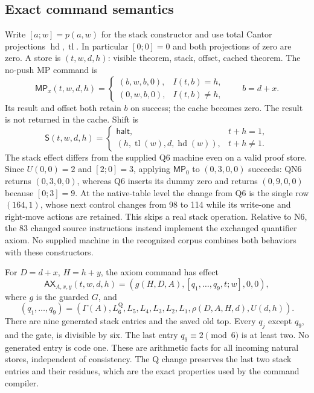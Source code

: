 \subsection{Exact command semantics}

Write $[a;w]=p(a,w)$ for the stack constructor and use total Cantor
projections $\operatorname{hd},\operatorname{tl}$. In particular
$[0;0]=0$ and both projections of zero are zero. A store is $(t,w,d,h)$:
visible theorem, stack, offset, cached theorem. The no-push MP command is
\[
 \mathsf{MP}_x(t,w,d,h)=
 \begin{cases}
 (b,w,b,0),& I(t,b)=h,\\
 (0,w,b,0),& I(t,b)\ne h,
 \end{cases}
 \qquad b=d+x.                                      \tag{QN3}
\]
Its result and offset both retain $b$ on success; the cache becomes zero.
The result is not returned in the cache. Shift is
\[
 \mathsf S(t,w,d,h)=
 \begin{cases}
 \mathsf{halt},&t+h=1,\\
 (h,\operatorname{tl}(w),d,\operatorname{hd}(w)),&t+h\ne1.
 \end{cases}                                        \tag{QN4}
\]
The stack effect differs from the supplied Q6 machine even on a valid
proof store. Since $U(0,0)=2$ and $[2;0]=3$, applying
$\mathsf{MP}_0$ to $(0,3,0,0)$ succeeds: QN6 returns $(0,3,0,0)$,
whereas Q6 inserts its dummy zero and returns $(0,9,0,0)$ because
$[0;3]=9$. At the native-table level the change from Q6 is the single
row $(164,1)$, whose next control changes from 98 to 114 while its
write-one and right-move actions are retained. This skips a real stack
operation. Relative to N6, the 83 changed source instructions instead
implement the exchanged quantifier axiom. No supplied machine in the
recognized corpus combines both behaviors with these constructors.

For $D=d+x$, $H=h+y$, the axiom command has effect
\[
 \mathsf{AX}_{A,x,y}(t,w,d,h)
  =(g(H,D,A),[q_1,\ldots,q_9,t;w],0,0),               \tag{QN5}
\]
where $g$ is the guarded $G$, and
\[
 (q_1,\ldots,q_9)=
 (\Gamma(A),L_6^{\mathrm Q},L_5,L_4,L_3,L_2,L_1,
       \rho(D,A,H,d),U(d,h)).
\]
There are nine generated stack entries and the saved old top. Every
$q_j$ except $q_9$, and the gate, is divisible by six. The last entry
$q_9\equiv2\pmod6$ is at least two. No generated entry is code one.
These are arithmetic facts for all incoming natural stores, independent
of consistency. The Q change preserves the last two stack entries and
their residues, which are the exact properties used by the command compiler.

